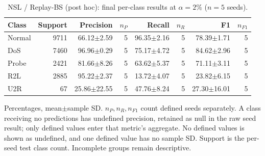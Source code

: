 \begin{table}[t]
\centering\scriptsize
\setlength{\tabcolsep}{3.3pt}
\caption{NSL / Replay-BS (post hoc): final per-class results at $\alpha=2\%$ ($n=5$ seeds).}\label{tab:forgetting-class-nsl_kdd-replay-bs}
\begin{tabular}{lrrrrrrr}
\toprule
Class & Support & Precision & $n_P$ & Recall & $n_R$ & F1 & $n_{F1}$ \\
\midrule
Normal & 9711 & 66.12$\pm$2.59 & 5 & 96.35$\pm$2.16 & 5 & 78.39$\pm$1.71 & 5 \\
DoS & 7460 & 96.96$\pm$0.29 & 5 & 75.17$\pm$4.72 & 5 & 84.62$\pm$2.96 & 5 \\
Probe & 2421 & 81.66$\pm$8.26 & 5 & 63.62$\pm$5.37 & 5 & 71.11$\pm$3.11 & 5 \\
R2L & 2885 & 95.22$\pm$2.37 & 5 & 13.72$\pm$4.07 & 5 & 23.82$\pm$6.15 & 5 \\
U2R & 67 & 25.86$\pm$22.55 & 5 & 47.76$\pm$8.24 & 5 & 27.30$\pm$16.01 & 5 \\
\bottomrule
\end{tabular}
\par\smallskip\begin{minipage}{0.98\textwidth}\scriptsize Percentages, mean$\pm$sample SD. $n_P,n_R,n_{F1}$ count defined seeds separately. A class receiving no predictions has undefined precision, retained as null in the raw seed result; only defined values enter that metric's aggregate. No defined values is shown as undefined, and one defined value has no sample SD. Support is the per-seed test class count. Incomplete groups remain descriptive.\end{minipage}
\end{table}

